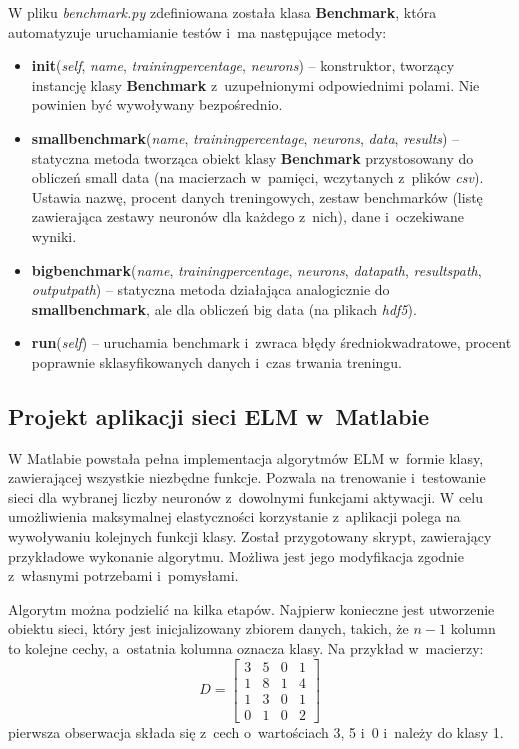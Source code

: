 \documentclass{article}
\begin{document}
W pliku \textit{benchmark.py} zdefiniowana została klasa \textbf{Benchmark}, która automatyzuje uruchamianie testów i~ma następujące metody:
\begin{itemize}
\item \textbf{\textunderscore \textunderscore init\textunderscore \textunderscore}(\textit{self}, \textit{name}, \textit{training\textunderscore percentage}, \textit{neurons}) -- konstruktor, tworzący instancję klasy \textbf{Benchmark} z~uzupełnionymi odpowiednimi polami. Nie powinien być wywoływany bezpośrednio.
\item \textbf{small\textunderscore benchmark}(\textit{name}, \textit{training\textunderscore percentage}, \textit{neurons}, \textit{data}, \textit{results}) -- statyczna metoda tworząca obiekt klasy \textbf{Benchmark} przystosowany do obliczeń small data (na macierzach w~pamięci, wczytanych z~plików \textit{csv}). Ustawia nazwę, procent danych treningowych, zestaw benchmarków (listę zawierająca zestawy neuronów dla każdego z~nich), dane i~oczekiwane wyniki.
\item \textbf{big\textunderscore benchmark}(\textit{name}, \textit{training\textunderscore percentage}, \textit{neurons}, \textit{data\textunderscore path}, \textit{results\textunderscore path}, \textit{output\textunderscore path}) -- statyczna metoda działająca analogicznie do \textbf{small\textunderscore benchmark}, ale dla obliczeń big data (na plikach \textit{hdf5}). 
\item \textbf{run}(\textit{self}) -- uruchamia benchmark i~zwraca błędy średniokwadratowe, procent poprawnie sklasyfikowanych danych i~czas trwania treningu.
\end{itemize}

\subsection{Projekt aplikacji sieci ELM w~Matlabie}
W Matlabie powstała pełna implementacja algorytmów ELM w~formie klasy, zawierającej wszystkie niezbędne funkcje.
Pozwala na trenowanie i~testowanie sieci dla wybranej liczby neuronów z~dowolnymi funkcjami aktywacji. 
W celu umożliwienia maksymalnej elastyczności korzystanie z~aplikacji polega na wywoływaniu kolejnych funkcji klasy.
Został przygotowany skrypt, zawierający przykładowe wykonanie algorytmu.
Możliwa jest jego modyfikacja zgodnie z~własnymi potrzebami i~pomysłami.

Algorytm można podzielić na kilka etapów.
Najpierw konieczne jest utworzenie obiektu sieci, który jest inicjalizowany zbiorem danych, takich, że $n-1$ kolumn to kolejne cechy, a~ostatnia kolumna oznacza klasy.
Na przykład w~macierzy:
\[D= \begin{bmatrix} 3&5&0&1 \\ 1&8&1&4 \\ 1&3&0&1 \\ 0&1&0&2 \end{bmatrix}\]
pierwsza obserwacja składa się z~cech o~wartościach 3, 5 i~0 i~należy do klasy 1.
\end{document}
